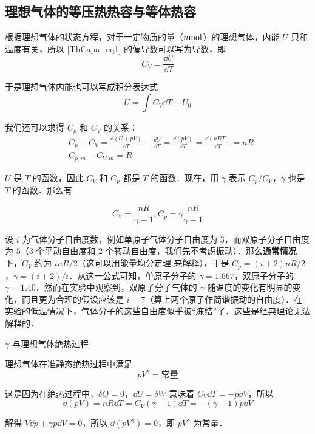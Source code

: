 \subsection{理想气体的等压热热容与等体热容}

根据理想气体的状态方程，对于一定物质的量（$n \rm{mol}$）的理想气体，内能 $U$ 只和温度有关，所以 \autoref{ThCapa_eq1} 的偏导数可以写为导数，即
\begin{equation}
C_V=\frac{\dd U}{\dd T}
\end{equation}

于是理想气体内能也可以写成积分表达式
\begin{equation}
U=\int C_V\dd T + U_0
\end{equation}

我们还可以求得 $C_p$ 和 $C_V$ 的关系：
\begin{align}
&C_p-C_V=\frac{\dd (U+pV)}{\dd T}-\frac{\dd U}{\dd T}=\frac{\dd(pV)}{\dd T}=\frac{\dd (nRT)}{\dd T}=nR\\
&C_{p,m}-C_{V,m}=R
\end{align}

$U$ 是 $T$ 的函数，因此 $C_V$ 和 $C_p$ 都是 $T$ 的函数．现在，用 $\gamma$ 表示 $C_p/C_V$，$\gamma$ 也是 $T$ 的函数．那么有

\begin{equation}
C_V=\frac{nR}{\gamma-1},C_p=\gamma\frac{nR}{\gamma-1}
\end{equation}

设 $i$ 为气体分子自由度数，例如单原子气体分子自由度为 $3$，而双原子分子自由度为 $5$（$3$ 个平动自由度和 $2$ 个转动自由度，我们先不考虑振动）．那么\textbf{通常情况}下，$C_V$ 约为 $inR/2$（这可以用能量均分定理 来解释），于是 $C_p=(i+2)nR/2$，$\gamma=(i+2)/i$．从这一公式可知，单原子分子的 $\gamma=1.667$，双原子分子的 $\gamma=1.40$．然而在实验中观察到，双原子分子气体的 $\gamma$ 随温度的变化有明显的变化，而且更为合理的假设应该是 $i=7$（算上两个原子作简谐振动的自由度）．在实验的低温情况下，气体分子的这些自由度似乎被“冻结”了．这些是经典理论无法解释的．
\begin{example}{$\gamma$ 与理想气体绝热过程}

理想气体在准静态绝热过程中满足
\begin{equation}
pV^{\gamma}=\text{常量}
\end{equation}

这是因为在绝热过程中，$\delta{Q}=0$，$\dd{U}=\delta{W}$ 意味着 $C_V\dd{T}=-p\dd{V}$，所以
\begin{equation}
\dd(pV)=nR\dd{T}=C_V(\gamma-1)\dd{T}=-(\gamma-1)p\dd{V}
\end{equation}

解得 $V\dd{p}+\gamma p\dd{V} = 0$，所以 $\dd{(pV^\gamma)}=0$，即 $pV^{\gamma}$ 为常量．
\end{example}
